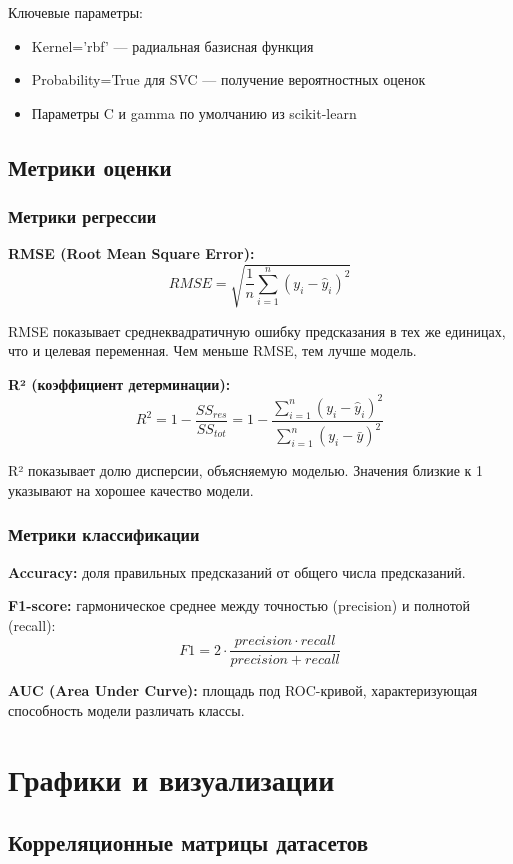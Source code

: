 \documentclass[a4paper]{article}
\begin{document}
Ключевые параметры:
\begin{itemize}
    \item Kernel='rbf' — радиальная базисная функция
    \item Probability=True для SVC — получение вероятностных оценок
    \item Параметры C и gamma по умолчанию из scikit-learn
\end{itemize}

\subsection{Метрики оценки}

\subsubsection{Метрики регрессии}
\textbf{RMSE (Root Mean Square Error):}
$$RMSE = \sqrt{\frac{1}{n}\sum_{i=1}^{n}(y_i - \hat{y}_i)^2}$$

RMSE показывает среднеквадратичную ошибку предсказания в тех же единицах, что и целевая переменная. Чем меньше RMSE, тем лучше модель.

\textbf{R² (коэффициент детерминации):}
$$R^2 = 1 - \frac{SS_{res}}{SS_{tot}} = 1 - \frac{\sum_{i=1}^{n}(y_i - \hat{y}_i)^2}{\sum_{i=1}^{n}(y_i - \bar{y})^2}$$

R² показывает долю дисперсии, объясняемую моделью. Значения близкие к 1 указывают на хорошее качество модели.

\subsubsection{Метрики классификации}
\textbf{Accuracy:} доля правильных предсказаний от общего числа предсказаний.

\textbf{F1-score:} гармоническое среднее между точностью (precision) и полнотой (recall):
$$F1 = 2 \cdot \frac{precision \cdot recall}{precision + recall}$$

\textbf{AUC (Area Under Curve):} площадь под ROC-кривой, характеризующая способность модели различать классы.

\section{Графики и визуализации}

\subsection{Корреляционные матрицы датасетов}
\end{document}

